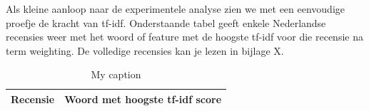 Als kleine aanloop naar de experimentele analyse zien we met een eenvoudige proefje de kracht van tf-idf. Onderstaande tabel geeft enkele Nederlandse recensies weer met het woord of feature met de hoogste tf-idf voor die recensie na term weighting. De volledige recensies kan je lezen in bijlage X.

\begin{table}[h]
\centering
\caption{My caption}
\label{my-label}
\begin{tabu} to \textwidth {|X|X|}
\hline
{\bf Recensie}                                                                                                                                                                                                                                                                                                                                                                                                                                                                                                                                                                                                                                                                                                                                                                                                                                                                                                                                                                                                                                                                                                                                                                                                                                                                                                                                                                                                                                                                                  & {\bf Woord met hoogste tf-idf score} \\ \hline

\end{tabu}
\end{table}
